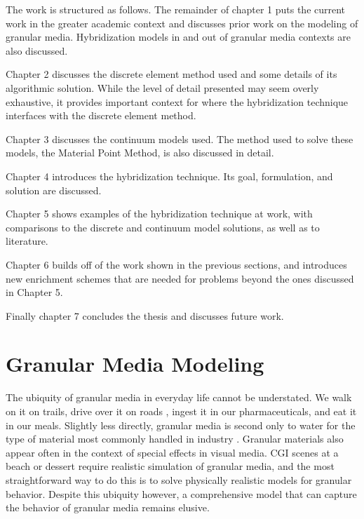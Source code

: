 The work is structured as follows. The remainder of chapter 1 puts the current work in the greater academic context and discusses prior work on the modeling of granular media. Hybridization models in and out of granular media contexts are also discussed. 

Chapter 2 discusses the discrete element method used and some details of its algorithmic solution. While the level of detail presented may seem overly exhaustive, it provides important context for where the hybridization technique interfaces with the discrete element method.

Chapter 3 discusses the continuum models used. The method used to solve these models, the Material Point Method, is also discussed in detail.

Chapter 4 introduces the hybridization technique. Its goal, formulation, and solution are discussed.

Chapter 5 shows examples of the hybridization technique at work, with comparisons to the discrete and continuum model solutions, as well as to literature.

Chapter 6 builds off of the work shown in the previous sections, and introduces new enrichment schemes that are needed for problems beyond the ones discussed in Chapter 5.

Finally chapter 7 concludes the thesis and discusses future work. 

\section{Granular Media Modeling}

The ubiquity of granular media in everyday life cannot be understated. We walk on it on trails, drive over it on roads \cite{sullivan06}, ingest it in our pharmaceuticals, and eat it in our meals. Slightly less directly, granular media is second only to water for the type of material most commonly handled in industry \cite{Richard:2005:Slow}. Granular materials also appear often in the context of special effects in visual media. CGI scenes at a beach or dessert require realistic simulation of granular media, and the most straightforward way to do this is to solve physically realistic models for granular behavior. Despite this ubiquity however, a comprehensive model that can capture the behavior of granular media remains elusive. 

